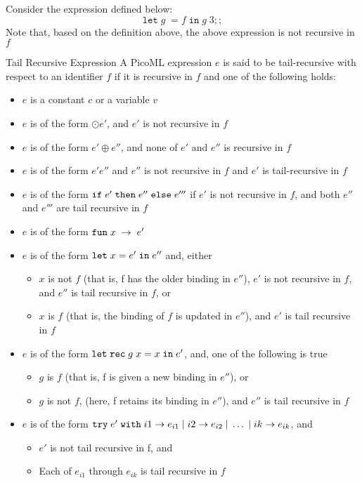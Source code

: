 \begin{example}
\label{ex:caveat}
Consider the expression defined below:
\[
\mathtt{let} \; {g} \; = f \; \mathtt{in} \; g \; 3;; 
\]
Note that, based on the definition above, the above expression is not recursive in $f$
 \end{example} 

\begin{definition}{Tail Recursive Expression}
\label{def:exptailrec}
A PicoML expression $e$ is said to be tail-recursive with respect to an identifier $f$ if it is recursive in $f$ and one of the following holds:
\begin{itemize}
\item $e$ is a constant $c$ or a variable $v$
\item $e$ is of the form $\odot e'$, and $e'$ is not recursive in $f$
\item $e$ is of the form $e' \oplus e''$, and none of $e'$ and $e''$ is recursive in $f$
\item $e$ is of the form $e' e''$ and $e''$ is not recursive in $f$ and $e'$ is tail-recursive in $f$
\item $e$ is of the form $\ifexp{e'}{e''}{e'''}$ if $e'$ is not recursive in $f$, and both $e''$ and $e'''$ are tail recursive in $f$
\item $e$ is of the form $\funexp{x}{e'}$
\item $e$ is of the form $\letinexp{x}{e'}{e''}$ and, either
  \begin{itemize}
   \item $x$ is not $f$ (that is, f has the older binding in $e''$), $e'$ is not recursive in $f$, and $e''$ is tail recursive in $f$, or
   \item $x$ is $f$ (that is, the binding of $f$ is updated in $e''$), and $e'$ is tail recursive in $f$
  \end{itemize}
\item $e$ is of the form $\letrecinexp{g}{x}{e'}{e''}$, and, one of the following is true
  \begin{itemize}
   \item $g$ is $f$ (that is, f is given a new binding in $e''$), or
   \item $g$ is not $f$, (here, f retains its binding in $e''$), and $e''$ is tail recursive in $f$
  \end{itemize}
\item $e$ is of the form $\mathtt{try} \; e' \; \mathtt{with} \; i1 \arr e_{i1} \; | \; i2 \arr e_{i2} \; | \; \ldots \; | \; ik \arr e_{ik}$, and
  \begin{itemize}
   \item $e'$ is not tail recursive in f, and
   \item Each of $e_{i1}$ through $e_{ik}$ is tail recursive in $f$
  \end{itemize}
\end{itemize}
\end{definition}

